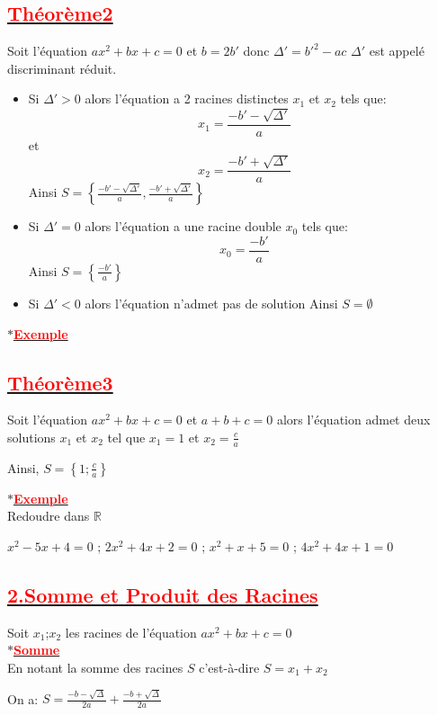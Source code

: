 \documentclass[12pt]{article}
\begin{document}
\subsection*{\underline{\textbf{\textcolor{red}{Théorème2}}}}
Soit l'équation $ax^{2}+bx+c=0$ et $b=2b'$ donc $\Delta'=b'^{2}-ac$
$\Delta'$ est appelé discriminant réduit.
\begin{itemize}
    \item Si $\Delta' >0$ alors l'équation a 2 racines distinctes $x_{1}$ et $x_{2}$ tels que:
            \[x_{1}=\frac{-b'-\sqrt{\Delta'}}{a}\] et \[x_{2}=\frac{-b'+\sqrt{\Delta'}}{a}\]
            Ainsi $S=\left\lbrace \frac{-b'-\sqrt{\Delta'}}{a}, \frac{-b'+\sqrt{\Delta'}}{a} \right\rbrace$
     \item Si $\Delta' =0$ alors l'équation a une racine double $x_{0}$ tels que:
            \[x_{0}=\frac{-b'}{a}\]
            Ainsi $S=\left\lbrace \frac{-b'}{a} \right\rbrace$
      \item Si $\Delta' <0$ alors l'équation n'admet pas de solution
            Ainsi $S=\emptyset$
        \end{itemize}
$\ast$\underline{\textbf{\textcolor{red}{Exemple}}}\\
\subsection*{\underline{\textbf{\textcolor{red}{Théorème3}}}}
Soit l'équation $ax^{2}+bx+c=0$ et $a+b+c=0$ alors l'équation admet deux solutions $x_{1}$ et $x_{2}$ tel que $x_{1}=1$ et $x_{2}=\frac{c}{a}$

Ainsi, $S=\left\lbrace 1; \frac{c}{a} \right\rbrace $

$\ast$\underline{\textbf{\textcolor{red}{Exemple}}}\\
Redoudre dans $\mathbb{R}$

$x^{2}-5x+4=0$ ; $2x^{2}+4x+2=0$ ; $x^{2}+x+5=0$ ; $4x^{2}+4x+1=0$
\subsection*{\underline{\textbf{\textcolor{red}{2.Somme et Produit des Racines}}}}
Soit $x_{1}$;$x_{2}$ les racines de l'équation $ax^{2}+bx+c=0$\\
$\ast$\underline{\textbf{\textcolor{red}{Somme}}}\\
En notant la somme des racines $S$ c'est-à-dire $S=x_{1}+x_{2}$

On a: $S=\frac{-b-\sqrt{\Delta}}{2a}+\frac{-b+\sqrt{\Delta}}{2a}$
\end{document}
